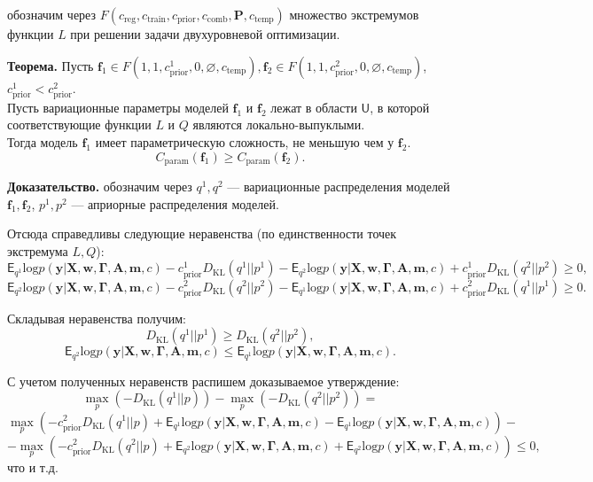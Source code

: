 обозначим через $F(c_{\text{reg}}, c_{\text{train}}, c_{\text{prior}}, c_{\text{comb}}, \mathbf{P}, c_{\text{temp}})$ множество экстремумов функции $L$ при решении задачи двухуровневой оптимизации.


\textbf{Теорема.}  
Пусть $\mathbf{f}_1 \in F(1, 1, c_{\text{prior}}^1, 0, \varnothing,  c_{\text{temp}} ), \mathbf{f}_2 \in F(1, 1, c_{\text{prior}}^2, 0, \varnothing,  c_{\text{temp}})$, $c_{\text{prior}}^1 < c_{\text{prior}}^2$.\\
Пусть вариационные параметры моделей $\mathbf{f}_1$ и $\mathbf{f}_2$ лежат в области $\mathsf{U}$, в которой соответствующие функции $L$ и $Q$ являются локально-выпуклыми.\\ 
Тогда модель $\mathbf{f}_1$ имеет параметрическую сложность, не меньшую чем у $\mathbf{f}_2$.
\[
    C_\text{param}(\mathbf{f}_1) \geq C_\text{param}(\mathbf{f}_2).
\]

\textbf{Доказательство.}
обозначим через $q^1, q^2$ --- вариационные распределения моделей $\mathbf{f}_1, \mathbf{f}_2$, 
$p^1, p^2$ --- априорные распределения моделей.
 
 Отсюда справедливы следующие неравенства (по единственности точек экстремума $L,Q$):
\[
    \mathsf{E}_{q^1}\text{log} p(\mathbf{y}|\mathbf{X},\mathbf{w}, \boldsymbol{\Gamma}, \mathbf{A},\mathbf{m}, c) - c_{\text{prior}}^1  D_\text{KL}(q^1||p^1)  -  \mathsf{E}_{q^2}\text{log} p(\mathbf{y}|\mathbf{X},\mathbf{w}, \boldsymbol{\Gamma}, \mathbf{A},\mathbf{m}, c) + c_{\text{prior}}^1  D_\text{KL}(q^2||p^2) \geq 0,
\]
\[
    \mathsf{E}_{q^2}\text{log} p(\mathbf{y}|\mathbf{X},\mathbf{w}, \boldsymbol{\Gamma}, \mathbf{A},\mathbf{m}, c) - c_{\text{prior}}^2  D_\text{KL}(q^2||p^2)  -  \mathsf{E}_{q^1}\text{log} p(\mathbf{y}|\mathbf{X},\mathbf{w}, \boldsymbol{\Gamma}, \mathbf{A},\mathbf{m}, c) + c_{\text{prior}}^2  D_\text{KL}(q^1||p^1) \geq 0.
\]

Складывая неравенства получим:
\[
    D_\text{KL}(q^1||p^1) \geq D_\text{KL}(q^2||p^2),
\]
\[
    \mathsf{E}_{q^2}\text{log} p(\mathbf{y}|\mathbf{X},\mathbf{w}, \boldsymbol{\Gamma}, \mathbf{A},\mathbf{m}, c)  \leq \mathsf{E}_{q^1}\text{log} p(\mathbf{y}|\mathbf{X},\mathbf{w}, \boldsymbol{\Gamma}, \mathbf{A},\mathbf{m}, c) .
\]

С учетом полученных неравенств распишем доказываемое утверждение:
\[
    \max_p \left(-D_\text{KL}(q^1||p)\right) - \max_{p} \left(-D_\text{KL}(q^2||p^2)\right) = 
\]
\[ \max_p  \left(-c_{\text{prior}}^2 D_\text{KL}(q^1||p) +\mathsf{E}_{q^1}\text{log} p(\mathbf{y}|\mathbf{X},\mathbf{w}, \boldsymbol{\Gamma}, \mathbf{A},\mathbf{m}, c) - \mathsf{E}_{q^1}\text{log} p(\mathbf{y}|\mathbf{X},\mathbf{w}, \boldsymbol{\Gamma}, \mathbf{A},\mathbf{m}, c) \right) -
\]
\[  - \max_{p} \left(-c_{\text{prior}}^2 D_\text{KL}(q^2||p)  + \mathsf{E}_{q^2}\text{log} p(\mathbf{y}|\mathbf{X},\mathbf{w}, \boldsymbol{\Gamma}, \mathbf{A},\mathbf{m}, c) +\mathsf{E}_{q^2}\text{log} p(\mathbf{y}|\mathbf{X},\mathbf{w}, \boldsymbol{\Gamma}, \mathbf{A},\mathbf{m}, c)  \right)    \leq 0,  
\]
что и т.д.
\clearpage

